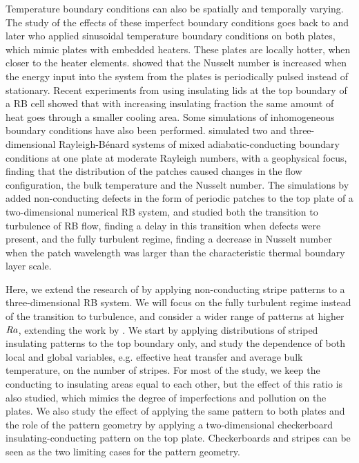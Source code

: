\documentclass{jfm}
\newcommand\Ray{\mbox{\textit{Ra}}}  %
\begin{document}
Temperature boundary conditions can also be spatially and temporally varying.
The study of the effects of these imperfect boundary conditions goes back to
\cite{kel78} and later \cite{yoo91} who applied sinusoidal temperature
boundary conditions on both plates, which mimic plates with embedded heaters.
These plates are locally hotter, when closer to the heater elements.
\cite{jin08} showed that the Nusselt number is increased when the energy input
into the system from the plates is periodically pulsed instead of stationary.
Recent experiments from \cite{wang17} using insulating lids at the top
boundary of a RB cell showed that with increasing insulating fraction the same
amount of heat goes through a smaller cooling area.   Some
simulations of inhomogeneous boundary conditions have also been
performed. \cite{cooper13} simulated two and three-dimensional
Rayleigh-B\'enard systems of mixed adiabatic-conducting boundary
conditions at one plate at moderate Rayleigh numbers, with a
geophysical focus, finding that the distribution of the patches caused
changes in the flow configuration, the bulk temperature and the
Nusselt number. The simulations by \cite{rip14} added non-conducting
defects in the form of periodic patches to the top plate of a
two-dimensional numerical RB system, and studied both the transition
to turbulence of RB flow, finding a delay in this transition when
defects were present, and the fully turbulent regime, finding a
decrease in Nusselt number when the patch wavelength was larger than the
characteristic thermal boundary layer scale. 

Here, we extend the research of \cite{rip14} by applying non-conducting stripe
patterns to a three-dimensional RB system.  We will focus on the fully
turbulent regime instead of the transition to turbulence,
and consider a wider range of patterns at higher $\Ray$, extending 
the work by \cite{cooper13}.  We start by
applying distributions of striped insulating patterns to the top boundary
only, and study the dependence of both local and global variables, e.g.
effective heat transfer and average bulk temperature, on the number of
stripes.  For most of the study, we keep the conducting to insulating areas
equal to each other, but the effect of this ratio is also studied, which
mimics the degree of imperfections and pollution on the plates.  We also study
the effect of applying the same pattern to both plates and the role of the
pattern geometry by applying a two-dimensional checkerboard
insulating-conducting pattern on the top plate.  Checkerboards and stripes can
be seen as the two limiting cases for the pattern geometry.
\end{document}
